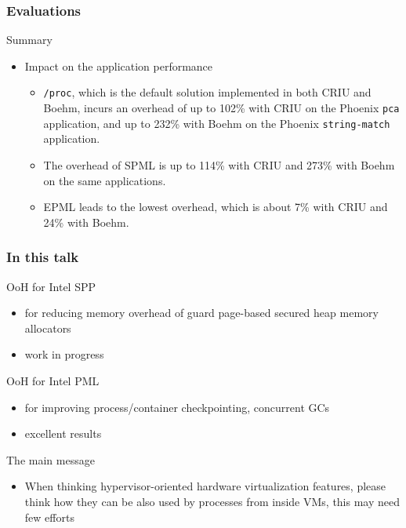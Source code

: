 \documentclass[xcolor=table,bigger,unknownkeysallowed]{beamer}
\begin{document}
        \begin{frame}
                \frametitle{Evaluations}
				\begin{block}{Summary}
					\begin{itemize}		
						\item Impact on the application performance
						\begin{itemize}
							\item \texttt{/proc}, which is the default solution implemented in both CRIU and Boehm, incurs an overhead of up to 102\% with CRIU on the Phoenix \texttt{pca} application, and up to 232\% with Boehm on the Phoenix \texttt{string-match} application.
							\item The overhead of SPML is up to 114\% with CRIU and 273\% with Boehm on the same applications.
							\item EPML leads to the lowest overhead, which is about 7\% with CRIU and 24\% with Boehm.
						\end{itemize}																							
					\end{itemize}
			\end{block}
        \end{frame}           
        \begin{frame}
        \frametitle{In this talk} 
			\begin{block}{OoH for Intel SPP}
				\begin{itemize}
					\item for reducing memory overhead of guard page-based secured heap memory allocators
					\item work in progress
				\end{itemize}
			\end{block}
			\begin{block}{OoH for Intel PML}
				\begin{itemize}
					\item for improving process/container checkpointing, concurrent GCs
					\item excellent results
				\end{itemize}
			\end{block}	
			\begin{block}{The main message}
				\begin{itemize}
					\item When thinking hypervisor-oriented hardware virtualization features, please think how they can be also used by processes from inside VMs, this may need few efforts
				\end{itemize}
			\end{block}							
        \end{frame}                       
\end{document}
